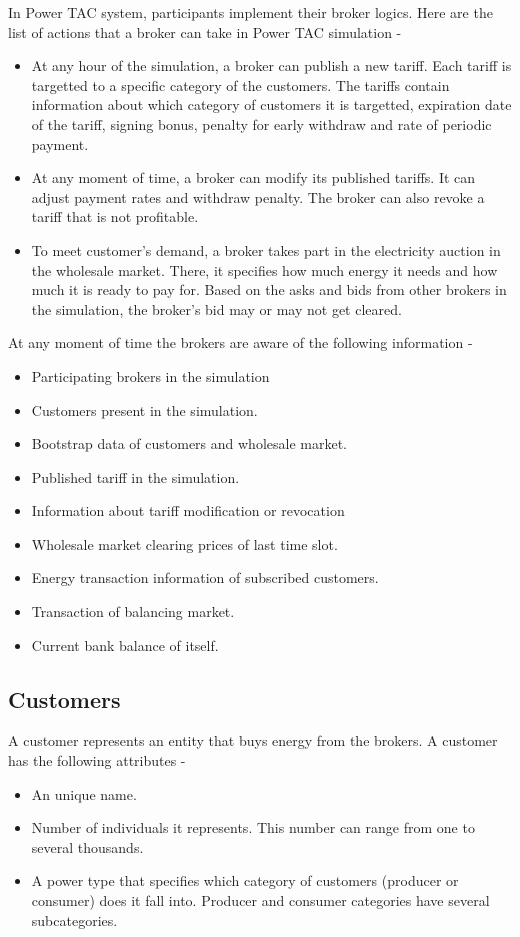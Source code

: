 In Power TAC system, participants implement their broker logics. Here are the list of actions that a broker can take in Power TAC simulation -
\begin{itemize}  
\item At any hour of the simulation, a broker can publish a new tariff. Each tariff is targetted to a specific category of the customers. The tariffs contain information about which category of customers it is targetted, expiration date of the tariff, signing bonus, penalty for early withdraw and rate of periodic payment. 
\item At any moment of time, a broker can modify its published tariffs. It can adjust payment rates and withdraw penalty. The broker can also revoke a tariff that is not profitable.
\item To meet customer's demand, a broker takes part in the electricity auction in the wholesale market. There, it specifies how much energy it needs and how much it is ready to pay for. Based on the asks and bids from other brokers in the simulation, the broker's bid may or may not get cleared. 
\end{itemize}

At any moment of time the brokers are aware of the following information - 
\begin{itemize}  
\item Participating brokers in the simulation 
\item Customers present in the simulation. 
\item Bootstrap data of customers and wholesale market.
\item Published tariff in the simulation.
\item Information about tariff modification or revocation
\item Wholesale market clearing prices of last time slot.
\item Energy transaction information of subscribed customers.
\item Transaction of balancing market.
\item Current bank balance of itself.
\end{itemize}


\subsection{Customers}
A customer represents an entity that buys energy from the brokers. A customer has the following attributes -
\begin{itemize}  
\item An unique name. 
\item Number of individuals it represents. This number can range from one to several thousands. 
\item A power type that specifies which category of customers (producer or consumer) does it fall into. Producer and consumer categories have several subcategories. 
\end{itemize}

